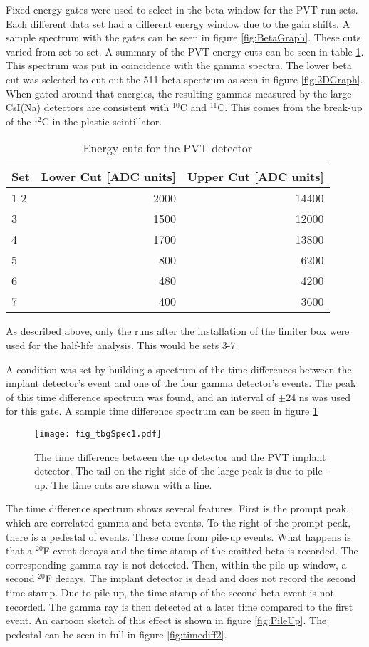 \documentclass[MaxHughesThesis.tex]{subfiles}
\begin{document}
Fixed energy gates were used to select in the beta window for the PVT run sets.
Each different data set had a different energy window due to the gain shifts.
A sample spectrum with the gates can be seen in figure \ref{fig:BetaGraph}.
These cuts varied from set to set.
A summary of the PVT energy cuts can be seen in table \ref{tab:PVTCuts}.
This spectrum was put in coincidence with the gamma spectra. 
The lower beta cut was selected to cut out the 511 beta spectrum as seen in figure \ref{fig:2DGraph}.
When gated around that energies, the resulting gammas measured by the large CsI(Na) detectors are consistent with $^{10}$C and $^{11}$C.
This comes from the break-up of the $^{12}$C in the plastic scintillator. 

\begin{table}[!htb]
	\centering
	\caption{Energy cuts for the PVT detector}
	\begin{tabular}{lrr}
	Set & Lower Cut [ADC units] & Upper Cut [ADC units] \\ \hline
	1-2 & 2000 & 14400 \\
	3 & 1500 & 12000\\
	4 & 1700 & 13800 \\
	5 & 800 & 6200 \\
	6 & 480 & 4200 \\
	7 & 400 & 3600
	\end{tabular}
	\label{tab:PVTCuts}
\end{table}
As described above, only the runs after the installation of the limiter box were used for the half-life analysis. 
This would be sets 3-7.

A condition was set by building a spectrum of the time differences between the implant detector's event and one of the four gamma detector's events. 
The peak of this time difference spectrum was found, and an interval of $\pm$24 ns was used for this gate.
A sample time difference spectrum can be seen in figure \ref{fig:timediff}

\begin{figure}
	\centerline{\texttt{[image: fig\_tbgSpec1.pdf]}}	
	\caption{The time difference between the up detector and the PVT implant detector.
		The tail on the right side of the large peak is due to pile-up.
		The time cuts are shown with a line.}
	\label{fig:timediff}
\end{figure}

The time difference spectrum shows several features.
First is the prompt peak, which are correlated gamma and beta events. 
To the right of the prompt peak, there is a pedestal of events.
These come from pile-up events.
What happens is that a $^{20}$F event decays and the time stamp of the emitted beta is recorded.
The corresponding gamma ray is not detected.
Then, within the pile-up window, a second $^{20}$F decays.  
The implant detector is dead and does not record the second time stamp.
Due to pile-up, the time stamp of the second beta event is not recorded.
The gamma ray is then detected at a later time compared to the first event.
An cartoon sketch of this effect is shown in figure \ref{fig:PileUp}.
The pedestal can be seen in full in figure \ref{fig:timediff2}.
\end{document}
